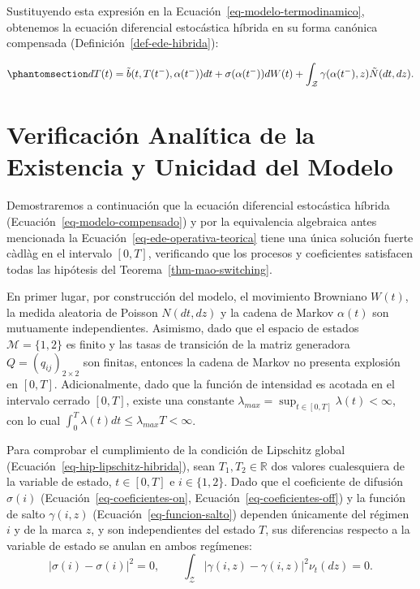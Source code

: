 \documentclass[
  spanish,
  us-letterpaper,
]{scrreprt}
\numberwithin{equation}{section}
\theoremstyle{plain}
\theoremstyle{plain}
\theoremstyle{definition}
\theoremstyle{plain}
\theoremstyle{remark}
\begin{document}
Sustituyendo esta expresión en la
Ecuación~\ref{eq-modelo-termodinamico}, obtenemos la ecuación
diferencial estocástica híbrida en su forma canónica compensada
(Definición~\ref{def-ede-hibrida}):

\begin{equation}\phantomsection\label{eq-modelo-compensado}{
dT(t) = \tilde{b}(t, T(t^-), \alpha(t^-)) dt + \sigma(\alpha(t^-)) dW(t) + \int_{\mathcal{Z}} \gamma(\alpha(t^-), z) \tilde{N}(dt, dz).
}\end{equation}

\section{Verificación Analítica de la Existencia y Unicidad del
Modelo}\label{sec-verificacion-existencia-unicidad}

Demostraremos a continuación que la ecuación diferencial estocástica
híbrida (Ecuación~\ref{eq-modelo-compensado}) y por la equivalencia
algebraica antes mencionada la Ecuación~\ref{eq-ede-operativa-teorica}
tiene una única solución fuerte càdlàg en el intervalo \([0, T]\),
verificando que los procesos y coeficientes satisfacen todas las
hipótesis del Teorema~\ref{thm-mao-switching}.

En primer lugar, por construcción del modelo, el movimiento Browniano
\(W(t)\), la medida aleatoria de Poisson \(N(dt, dz)\) y la cadena de
Markov \(\alpha(t)\) son mutuamente independientes. Asimismo, dado que
el espacio de estados \(\mathcal{M} = \{1, 2\}\) es finito y las tasas
de transición de la matriz generadora \(Q = (q_{ij})_{2 \times 2}\) son
finitas, entonces la cadena de Markov no presenta explosión en
\([0, T]\). Adicionalmente, dado que la función de intensidad es acotada
en el intervalo cerrado \([0, T]\), existe una constante
\(\displaystyle \lambda_{max} = \sup_{t \in [0, T]} \lambda(t) < \infty\),
con lo cual
\(\displaystyle \int_0^T \lambda(t)dt \le \lambda_{max}T < \infty\).

Para comprobar el cumplimiento de la condición de Lipschitz global
(Ecuación~\ref{eq-hip-lipschitz-hibrida}), sean
\(T_1, T_2 \in \mathbb{R}\) dos valores cualesquiera de la variable de
estado, \(t \in [0, T]\) e \(i \in \{1, 2\}\). Dado que el coeficiente
de difusión \(\sigma(i)\) (Ecuación~\ref{eq-coeficientes-on},
Ecuación~\ref{eq-coeficientes-off}) y la función de salto
\(\gamma(i, z)\) (Ecuación~\ref{eq-funcion-salto}) dependen únicamente
del régimen \(i\) y de la marca \(z\), y son independientes del estado
\(T\), sus diferencias respecto a la variable de estado se anulan en
ambos regímenes: \[
\vert \sigma(i) - \sigma(i) \vert^2 = 0, \qquad \int_{\mathcal{Z}} \vert \gamma(i, z) - \gamma(i, z) \vert^2 \nu_t(dz) = 0.
\]
\end{document}
